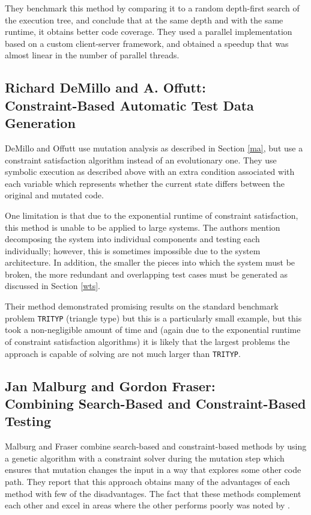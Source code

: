 \documentclass{sig-alternate-05-2015}
\begin{document}
They benchmark this method by comparing it to a random depth-first search of
the execution tree, and conclude that at the same depth and with the same
runtime, it obtains better code coverage. They used a parallel implementation
based on a custom client-server framework, and obtained a speedup that was
almost linear in the number of parallel threads.

\subsection{Richard DeMillo and A. Offutt: \\Constraint-Based Automatic Test
            Data Generation}

DeMillo and Offutt \cite{demillo} use mutation analysis as described in Section 
\ref{ma}, but
use a constraint satisfaction algorithm instead of an evolutionary one. They
use symbolic execution as described above with an extra condition associated
with each variable which represents whether the current state differs between
the original and mutated code.

One limitation is that due to the exponential runtime of constraint
satisfaction, this method is unable to be applied to large systems. The authors
mention decomposing the system into individual components and testing each
individually; however, this is sometimes impossible due to the system
architecture. In addition, the smaller the pieces into which the system must be
broken, the more redundant and overlapping test cases must be generated as
discussed in Section \ref{wts}.

Their method demonstrated promising results on the standard benchmark problem
\texttt{TRITYP} (triangle type) but this is a particularly small example, but
this took a non-negligible amount of time and (again due to the exponential
runtime of constraint satisfaction algorithms) it is likely that the largest
problems the approach is capable of solving are not much larger than
\texttt{TRITYP}.

\subsection{Jan Malburg and Gordon Fraser: \\Combining Search-Based and
            Constraint-Based Testing}

Malburg and Fraser \cite{malburg} combine search-based and constraint-based
methods by using
a genetic algorithm with a constraint solver during the mutation step which
ensures that mutation changes the input in a way that explores some other code
path. They report that this approach obtains many of the advantages of each
method with few of the disadvantages. The fact that these methods complement
each other and excel in areas where the other performs poorly was noted by
\cite{lakhotia}.
\end{document}
